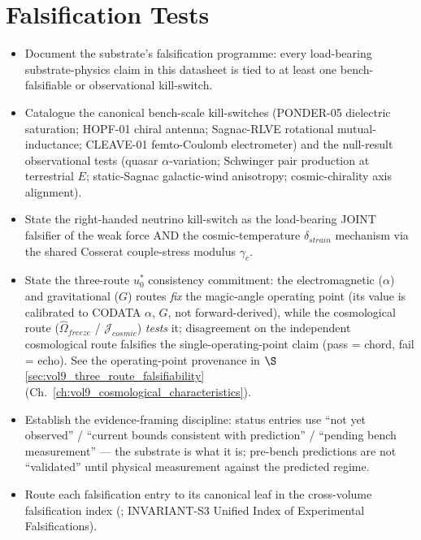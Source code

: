 \chapter{Falsification Tests}
\label{ch:vol9_falsification_tests}

\begin{objectivebox}
\begin{itemize}
    \item Document the substrate's falsification programme: every load-bearing substrate-physics claim in this datasheet is tied to at least one bench-falsifiable or observational kill-switch.
    \item Catalogue the canonical bench-scale kill-switches (PONDER-05 dielectric saturation; HOPF-01 chiral antenna; Sagnac-RLVE rotational mutual-inductance; CLEAVE-01 femto-Coulomb electrometer) and the null-result observational tests (quasar $\alpha$-variation; Schwinger pair production at terrestrial $E$; static-Sagnac galactic-wind anisotropy; cosmic-chirality axis alignment).
    \item State the right-handed neutrino kill-switch as the load-bearing JOINT falsifier of the weak force AND the cosmic-temperature $\delta_{strain}$ mechanism via the shared Cosserat couple-stress modulus $\gamma_c$.
    \item State the three-route $u_0^*$ consistency commitment: the electromagnetic ($\alpha$) and gravitational ($G$) routes \emph{fix} the magic-angle operating point (its value is calibrated to CODATA $\alpha$, $G$, not forward-derived), while the cosmological route ($\hat{\Omega}_{freeze}$ / $\mathcal{J}_{cosmic}$) \emph{tests} it; disagreement on the independent cosmological route falsifies the single-operating-point claim (pass = chord, fail = echo). See the operating-point provenance in $\S$\ref{sec:vol9_three_route_falsifiability} (Ch.~\ref{ch:vol9_cosmological_characteristics}).
    \item Establish the evidence-framing discipline: status entries use ``not yet observed'' / ``current bounds consistent with prediction'' / ``pending bench measurement'' --- the substrate is what it is; pre-bench predictions are not ``validated'' until physical measurement against the predicted regime.
    \item Route each falsification entry to its canonical leaf in the cross-volume falsification index (; INVARIANT-S3 Unified Index of Experimental Falsifications).
\end{itemize}
\end{objectivebox}

